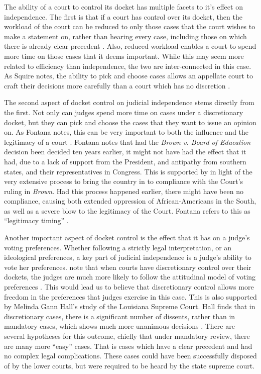 \documentclass[12pt]{article}
\begin{document}
The ability of a court to control its docket has multiple facets to it's effect on independence.  The first is that if a court has control over its docket, then the workload of the court can be reduced to only those cases that the court wishes to make a statement on, rather than hearing every case, including those on which there is already clear precedent \citep{Maltzman2000}.  Also, reduced workload enables a court to spend more time on those cases that it deems important.  While this may seem more related to efficiency than independence, the two are inter-connected in this case.  As Squire notes, the ability to pick and choose cases allows an appellate court to craft their decisions more carefully than a court which has no discretion \citep{Squire2008}.

The second aspect of docket control on judicial independence stems directly from the first.  Not only can judges spend more time on cases under a discretionary docket, but they can pick and choose the cases that they want to issue an opinion on.  As Fontana notes, this can be very important to both the influence and the legitimacy of a court \citep{Fontana2011}.  Fontana notes that had the \textit{Brown v. Board of Education} decision been decided ten years earlier, it might not have had the effect that it had, due to a lack of support from the President, and antipathy from southern states, and their representatives in Congress.  This is supported by \citet{Rosenberg1991} in light of the very extensive process to bring the country in to compliance with the Court's ruling in \textit{Brown}.  Had this process happened earlier, there might have been no compliance, causing both extended oppression of African-Americans in the South, as well as a severe blow to the legitimacy of the Court.  Fontana refers to this as ``legitimacy timing'' \citep[627]{Fontana2011}.  

Another important aspect of docket control is the effect that it has on a judge's voting preferences.  Whether following a strictly legal interpretation, or an ideological preferences, a key part of judicial independence is a judge's ability to vote her preferences.  \citeauthor{Songer2003} note that when courts have discretionary control over their dockets, the judges are much more likely to follow the attitudinal model of voting preferences \citep{Songer2003}.  This would lead us to believe that discretionary control allows more freedom in the preferences that judges exercise in this case.   This is also supported by Melinda Gann Hall's study of the Louisiana Supreme Court.  Hall finds that in discretionary cases, there is a significant number of dissents, rather than in mandatory cases, which shows much more unanimous decisions \citep{Hall1985}.  There are several hypotheses for this outcome, chiefly that under mandatory review, there are many more ``easy'' cases.  That is cases which have a clear precedent and had no complex legal complications.  These cases could have been successfully disposed of by the lower courts, but were required to be heard by the state supreme court.   
\end{document}
